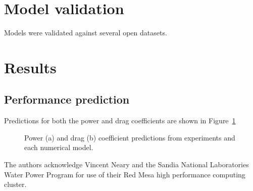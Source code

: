 \documentclass[aip,graphicx]{revtex4-1}
\begin{document}
\section{Model validation}

Models were validated against several open datasets.


\section{Results}

\subsection{Performance prediction}

Predictions for both the power and drag coefficients are shown in Figure~\ref{fig:perf-comp}

\begin{figure}[ht]
\caption{Power (a) and drag (b) coefficient predictions from experiments and
each numerical model.}
\label{fig:perf-comp}
\end{figure}






\begin{acknowledgments}
The authors acknowledge Vincent Neary and the Sandia National Laboratories Water
Power Program for use of their Red Mesa high performance computing cluster.
\end{acknowledgments}


\end{document}

